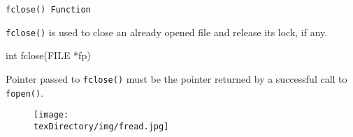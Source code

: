 \documentclass[compress]{beamer}
\begin{document}
\begin{slide}
	\begin{block}{\texttt{fclose() Function}}

	\texttt{fclose()} is used to close an already opened file and release its lock, if any.

	\begin{terminal}
	int fclose(FILE *fp)
	\end{terminal}

	Pointer passed to \texttt{fclose()} must be the pointer returned by a successful call to \texttt{fopen()}.

	\end{block}
\end{slide}

\begin{slide}
	\begin{figure}
	\texttt{[image: \\texDirectory/img/fread.jpg]}
	\end{figure}
\end{slide}
\end{document}
